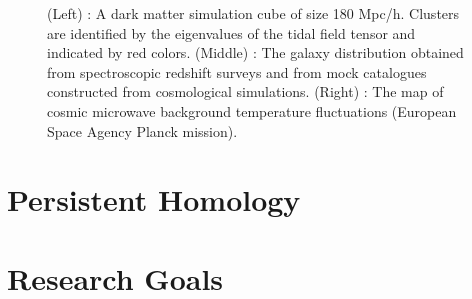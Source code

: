 \documentclass[12pt]{article}
\begin{document}
\begin{figure}[!htb]
\endminipage\hfill
\caption{(Left) : A dark matter simulation cube of size 180 Mpc/h. Clusters are identified by the eigenvalues of the tidal field tensor and indicated by red colors. (Middle) : The galaxy distribution obtained from spectroscopic redshift surveys and from mock catalogues constructed from cosmological simulations. (Right) : The map of cosmic microwave background temperature fluctuations (European Space Agency Planck mission). }
\end{figure}

\section{Persistent Homology}

\section{Research Goals}
\end{document}
